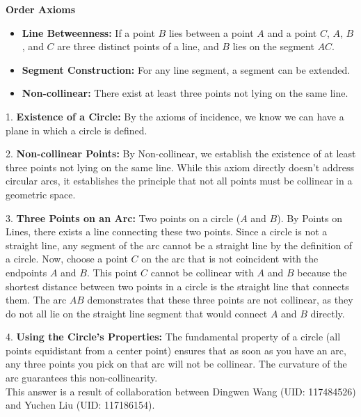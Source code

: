 \documentclass[letter,12pt]{article}
\begin{document}
\textbf{Order Axioms}
\begin{itemize}
	\item \textbf{Line Betweenness:} If a point $B$ lies between a point $A$ and a point $C$, $A$, $B$, and $C$ are three distinct points of a line, and $B$ lies on the segment $AC$.
	\item \textbf{Segment Construction:} For any line segment, a segment can be extended.
	\item \textbf{Non-collinear:} There exist at least three points not lying on the same line.
\end{itemize}


1. \textbf{Existence of a Circle:} By the axioms of incidence, we know we can have a plane in which a circle is defined.

2. \textbf{Non-collinear Points:} By Non-collinear, we establish the existence of at least three points not lying on the same line. While this axiom directly doesn't address circular arcs, it establishes the principle that not all points must be collinear in a geometric space.

3. \textbf{Three Points on an Arc:} Two points on a circle ($A$ and $B$). By Points on Lines, there exists a line connecting these two points. Since a circle is not a straight line, any segment of the arc cannot be a straight line by the definition of a circle. Now, choose a point $C$ on the arc that is not coincident with the endpoints $A$ and $B$. This point $C$ cannot be collinear with $A$ and $B$ because the shortest distance between two points in a circle is the straight line that connects them. The arc $AB$ demonstrates that these three points are not collinear, as they do not all lie on the straight line segment that would connect $A$ and $B$ directly.

4. \textbf{Using the Circle's Properties:} The fundamental property of a circle (all points equidistant from a center point) ensures that as soon as you have an arc, any three points you pick on that arc will not be collinear. The curvature of the arc guarantees this non-collinearity.\\

This answer is a result of collaboration between Dingwen Wang (UID: 117484526) and Yuchen Liu (UID: 117186154).
\pagebreak
\end{document}
